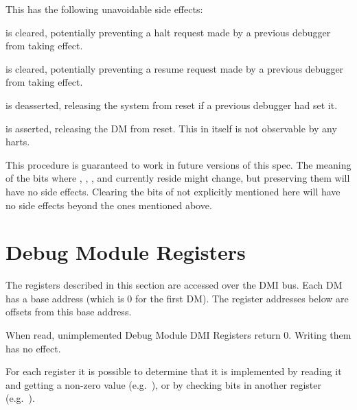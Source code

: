\begin{steps}{This has the following unavoidable side effects:}
    \item \FdmDmcontrolHaltreq is cleared, potentially preventing a halt request made by a
        previous debugger from taking effect.
    \item \FdmDmcontrolResumereq is cleared, potentially preventing a resume request made
        by a previous debugger from taking effect.
    \item \FdmDmcontrolNdmreset is deasserted, releasing the system from reset if a
        previous debugger had set it.
    \item \FdmDmcontrolDmactive is asserted, releasing the DM from reset. This in itself
        is not observable by any harts.
\end{steps}

This procedure is guaranteed to work in future versions of this spec.  The
meaning of the \RdmDmcontrol bits where \FdmDmcontrolHartreset, \FdmDmcontrolHasel, \FdmDmcontrolHartsello, and
\FdmDmcontrolHartselhi currently reside might change, but preserving them will have no
side effects. Clearing the bits of \RdmDmcontrol not explicitly mentioned here
will have no side effects beyond the ones mentioned above.

\section{Debug Module Registers} \label{dmdebbus}

The registers described in this section are accessed over the DMI bus.  Each DM
has a base address (which is 0 for the first DM). The register addresses below
are offsets from this base address.

When read, unimplemented Debug Module DMI Registers return 0. Writing them has
no effect.

For each register it is possible to determine that it is implemented by reading
it and getting a non-zero value (e.g.\ \RdmSbcs), or by checking bits in another
register (e.g.\ \FdmAbstractcsProgbufsize).


